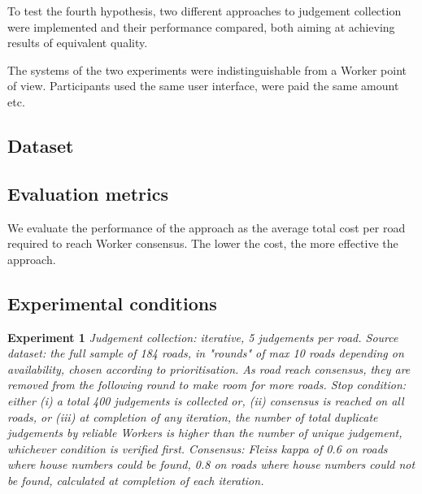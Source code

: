To test the fourth hypothesis, two different approaches to judgement collection were implemented and their performance compared, both aiming at achieving results of equivalent quality.

The systems of the two experiments were indistinguishable from a Worker point of view. Participants used the same user interface, were paid the same amount etc.

\subsection{Dataset}

\subsection{Evaluation metrics}

We evaluate the performance of the approach as the average total cost per road required to reach Worker consensus. The lower the cost, the more effective the approach.

\subsection{Experimental conditions}

\textbf{Experiment 1} {\it Judgement collection: iterative, 5 judgements per road. Source dataset: the full sample of 184 roads, in "rounds" of max 10 roads depending on availability, chosen according to prioritisation. As road reach consensus, they are removed from the following round to make room for more roads. Stop condition: either (i) a total 400 judgements is collected or, (ii) consensus is reached on all roads, or (iii) at completion of any iteration, the number of total duplicate judgements by reliable Workers is higher than the number of unique judgement, whichever condition is verified first. Consensus: Fleiss kappa of 0.6 on roads where house numbers could be found, 0.8 on roads where house numbers could not be found, calculated at completion of each iteration.} 

